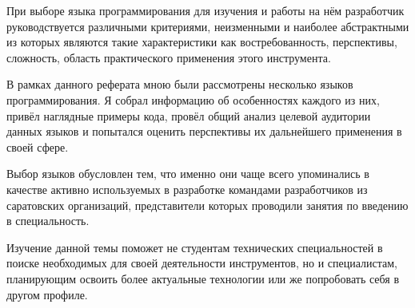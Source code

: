
\par При выборе языка программирования для изучения и работы на нём разработчик руководствуется различными критериями, неизменными и наиболее абстрактными из которых являются такие характеристики как востребованность, перспективы, сложность, область практического применения этого инструмента.

В рамках данного реферата мною были рассмотрены несколько языков программирования. Я собрал информацию об особенностях каждого из них, привёл наглядные примеры кода, провёл общий анализ целевой аудитории данных языков и попытался оценить перспективы их дальнейшего применения в своей сфере.

Выбор языков обусловлен тем, что именно они чаще всего упоминались в качестве активно используемых в разработке командами разработчиков из саратовских организаций, представители которых проводили занятия по введению в специальность.

Изучение данной темы поможет не студентам технических специальностей в поиске необходимых для своей деятельности инструментов, но и специалистам, планирующим освоить более актуальные технологии или же попробовать себя в другом профиле.